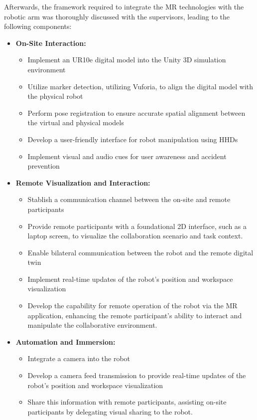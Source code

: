 Afterwards, the framework required to integrate the \ac{MR} technologies with the robotic arm was thoroughly discussed with the supervisors, leading to the following components:
\begin{itemize}
    \item \textbf{On-Site Interaction:}
    \begin{itemize}
        \item Implement an UR10e digital model into the Unity 3D simulation environment
        \item Utilize marker detection, utilizing Vuforia, to align the digital model with the physical robot
        \item Perform pose registration to ensure accurate spatial alignment between the virtual and physical models
        \item Develop a user-friendly interface for robot manipulation using \ac{HHDs}
        \item Implement visual and audio cues for user awareness and accident prevention 
    \end{itemize}
    \item \textbf{Remote Visualization and Interaction:}
    \begin{itemize}
        \item Stablish a communication channel between the on-site and remote participants
        \item Provide remote participants with a foundational 2D interface, such as a laptop screen, to visualize the collaboration scenario and 
        task context.
        \item Enable bilateral communication between the robot and the remote digital twin
        \item Implement real-time updates of the robot's position and workspace visualization
        \item Develop the capability for remote operation of the robot via the \ac{MR} application, enhancing the remote participant's ability to 
        interact and manipulate the collaborative environment.
    \end{itemize}
    \item \textbf{Automation and Immersion:}
    \begin{itemize}
        \item Integrate a camera into the robot 
        \item Develop a camera feed transmission to provide real-time updates of the robot's position and workspace visualization
        \item Share this information with remote participants, assisting on-site participants by delegating visual sharing to the robot.
    \end{itemize}
\end{itemize}



